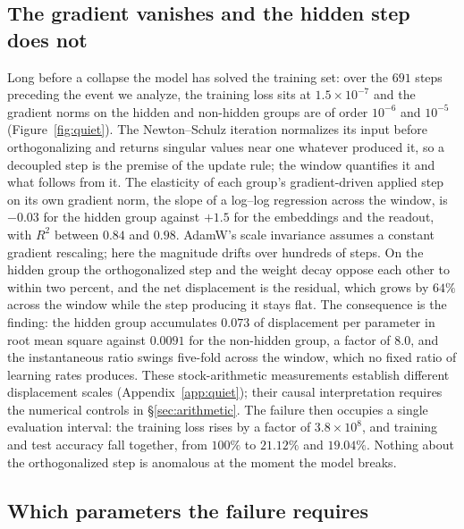 \documentclass{article}
\begin{document}
\subsection{The gradient vanishes and the hidden step does not}
\label{sec:quiet}

Long before a collapse the model has solved the training set: over the $691$ steps preceding the event we analyze, the training loss sits at $1.5\times10^{-7}$ and the gradient norms on the hidden and non-hidden groups are of order $10^{-6}$ and $10^{-5}$ (Figure~\ref{fig:quiet}). The Newton--Schulz iteration normalizes its input before orthogonalizing and returns singular values near one whatever produced it, so a decoupled step is the premise of the update rule; the window quantifies it and what follows from it. The elasticity of each group's gradient-driven applied step on its own gradient norm, the slope of a log--log regression across the window, is $-0.03$ for the hidden group against $+1.5$ for the embeddings and the readout, with $R^2$ between $0.84$ and $0.98$. AdamW's scale invariance assumes a constant gradient rescaling; here the magnitude drifts over hundreds of steps. On the hidden group the orthogonalized step and the weight decay oppose each other to within two percent, and the net displacement is the residual, which grows by $64\%$ across the window while the step producing it stays flat. The consequence is the finding: the hidden group accumulates $0.073$ of displacement per parameter in root mean square against $0.0091$ for the non-hidden group, a factor of $8.0$, and the instantaneous ratio swings five-fold across the window, which no fixed ratio of learning rates produces. These stock-arithmetic measurements establish different displacement scales (Appendix~\ref{app:quiet}); their causal interpretation requires the numerical controls in \S\ref{sec:arithmetic}. The failure then occupies a single evaluation interval: the training loss rises by a factor of $3.8\times10^{8}$, and training and test accuracy fall together, from $100\%$ to $21.12\%$ and $19.04\%$. Nothing about the orthogonalized step is anomalous at the moment the model breaks.

\subsection{Which parameters the failure requires}
\label{sec:branches}
\end{document}
